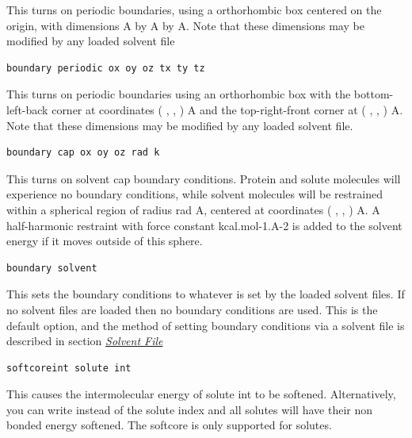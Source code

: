 \documentclass[letterpaper,10pt,english]{sphinxmanual}
\begin{document}
This turns on periodic boundaries, using a orthorhombic box centered on the origin, with dimensions  A by  A by  A. Note that these dimensions may be modified by any loaded solvent file

\begin{Verbatim}[commandchars=\\\{\}]
boundary periodic ox oy oz tx ty tz
\end{Verbatim}

This turns on periodic boundaries using an orthorhombic box with the bottom-left-back corner at coordinates ( ,  , ) A and the top-right-front corner at ( ,  , ) A. Note that these dimensions may be modified by any loaded solvent file.

\begin{Verbatim}[commandchars=\\\{\}]
boundary cap ox oy oz rad k
\end{Verbatim}

This turns on solvent cap boundary conditions. Protein and solute molecules will experience no boundary conditions, while solvent molecules will be restrained within a spherical region of radius rad A, centered at coordinates ( ,  , ) A. A half-harmonic restraint with force constant  kcal.mol-1.A-2 is added to the solvent energy if it moves outside of this sphere.

\begin{Verbatim}[commandchars=\\\{\}]
boundary solvent
\end{Verbatim}

This sets the boundary conditions to whatever is set by the loaded solvent files. If no solvent files are loaded then no boundary conditions are used. This is the default option, and the method of setting boundary conditions via a solvent file is described in section {\hyperref[protoms:solventpdb]{\emph{Solvent File}}}

\begin{Verbatim}[commandchars=\\\{\}]
softcoreint solute int
\end{Verbatim}

This causes the intermolecular energy of solute int to be softened. Alternatively, you can write  instead of the solute index and all solutes will have their non bonded energy softened. The softcore is only supported for solutes.
\end{document}
